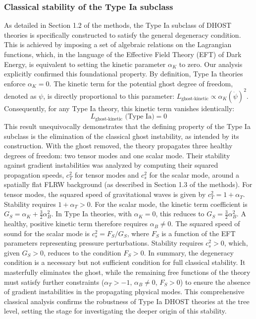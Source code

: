 \documentclass[twocolumn]{aastex631}
\begin{document}
\subsubsection{Classical stability of the Type Ia subclass}
As detailed in Section 1.2 of the methods, the Type Ia subclass of DHOST theories is specifically constructed to satisfy the general degeneracy condition. This is achieved by imposing a set of algebraic relations on the Lagrangian functions, which, in the language of the Effective Field Theory (EFT) of Dark Energy, is equivalent to setting the kinetic parameter $\alpha_K$ to zero. Our analysis explicitly confirmed this foundational property. By definition, Type Ia theories enforce $\alpha_K = 0$. The kinetic term for the potential ghost degree of freedom, denoted as $\psi$, is directly proportional to this parameter: $L_{\text{ghost-kinetic}} \propto \alpha_K (\dot{\psi})^2$. Consequently, for any Type Ia theory, this kinetic term vanishes identically:
\begin{equation} \label{eq:ghost_kinetic_vanishes}
    L_{\text{ghost-kinetic}} \text{ (Type Ia)} = 0
\end{equation}
This result unequivocally demonstrates that the defining property of the Type Ia subclass is the elimination of the classical ghost instability, as intended by its construction. With the ghost removed, the theory propagates three healthy degrees of freedom: two tensor modes and one scalar mode. Their stability against gradient instabilities was analyzed by computing their squared propagation speeds, $c_T^2$ for tensor modes and $c_s^2$ for the scalar mode, around a spatially flat FLRW background (as described in Section 1.3 of the methods).
For tensor modes, the squared speed of gravitational waves is given by $c_T^2 = 1 + \alpha_T$. Stability requires $1 + \alpha_T > 0$. For the scalar mode, the kinetic term coefficient is $G_S = \alpha_K + \frac{3}{2}\alpha_B^2$. In Type Ia theories, with $\alpha_K = 0$, this reduces to $G_S = \frac{3}{2}\alpha_B^2$. A healthy, positive kinetic term therefore requires $\alpha_B \neq 0$. The squared speed of sound for the scalar mode is $c_s^2 = F_S / G_S$, where $F_S$ is a function of the EFT parameters representing pressure perturbations. Stability requires $c_s^2 > 0$, which, given $G_S > 0$, reduces to the condition $F_S > 0$.
In summary, the degeneracy condition is a necessary but not sufficient condition for full classical stability. It masterfully eliminates the ghost, while the remaining free functions of the theory must satisfy further constraints ($\alpha_T > -1$, $\alpha_B \neq 0$, $F_S > 0$) to ensure the absence of gradient instabilities in the propagating physical modes. This comprehensive classical analysis confirms the robustness of Type Ia DHOST theories at the tree level, setting the stage for investigating the deeper origin of this stability.
\end{document}
